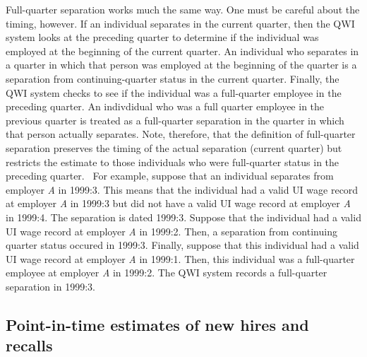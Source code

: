 Full-quarter separation works much the same way. One must be careful about
the timing, however. If an individual separates in the current quarter, then
the QWI system looks at the preceding quarter to determine if the individual
was employed at the beginning of the current quarter. An individual who
separates in a quarter in which that person was employed at the beginning of
the quarter is a separation from continuing-quarter status in the current
quarter. Finally, the QWI system checks to see if the individual was a
full-quarter employee in the preceding quarter. An indivdidual who was a
full quarter employee in the previous quarter is treated as a full-quarter
separation in the quarter in which that person actually separates. Note,
therefore, that the definition of full-quarter separation preserves the
timing of the actual separation (current quarter) but restricts the estimate
to those individuals who were full-quarter status in the preceding quarter.
\ For example, suppose that an individual separates from employer \textit{A}
in 1999:3. This means that the individual had a valid {UI} wage
record at employer \textit{A} in 1999:3 but did not have a valid {UI}
wage record at employer \textit{A} in 1999:4. The separation is dated
1999:3. Suppose that the individual had a valid {UI} wage record at
employer \textit{A} in 1999:2. Then, a separation from continuing quarter
status occured in 1999:3. Finally, suppose that this individual had a valid %
{UI} wage record at employer \textit{A} in 1999:1. Then, this
individual was a full-quarter employee at employer \textit{A} in 1999:2. The
QWI system records a full-quarter separation in 1999:3.

\subsection{Point-in-time estimates of new hires and recalls}

 

